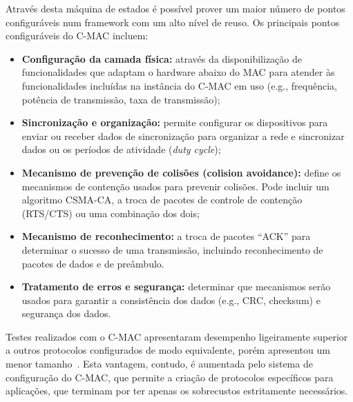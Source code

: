 Através desta máquina de estados é possível prover um maior número de pontos
configuráveis num framework com um alto nível de reuso. Os principais pontos
configuráveis do C-MAC incluem:
\begin{itemize}
  \item \textbf{Configuração da camada física:} através da disponibilização de
  funcionalidades que adaptam o hardware abaixo do MAC para atender às
  funcionalidades incluídas na instância do C-MAC em uso (e.g., frequência,
  potência de transmissão, taxa de transmissão);
  \item \textbf{Sincronização e organização:} permite configurar os dispositivos
  para enviar ou receber dados de sincronização para organizar a rede e
  sincronizar dados ou os períodos de atividade (\textit{duty cycle});
  \item \textbf{Mecanismo de prevenção de colisões (colision avoidance):} define
  os mecanismos de contenção usados para prevenir colisões. Pode incluir um
  algoritmo CSMA-CA, a troca de pacotes de controle de contenção (RTS/CTS) ou
  uma combinação dos dois;
  \item \textbf{Mecanismo de reconhecimento:} a troca de pacotes ``ACK'' para
  determinar o sucesso de uma transmissão, incluindo reconhecimento de pacotes
  de dados e de preâmbulo.
  \item \textbf{Tratamento de erros e segurança:} determinar que mecanismos
  serão usados para garantir a consistência dos dados (e.g., CRC, checksum) e
  segurança dos dados.
\end{itemize}

Testes realizados com o C-MAC apresentaram desempenho ligeiramente superior a
outros protocolos configurados de modo equivalente, porém apresentou um menor
tamanho~\cite{Wanner:IESS:2007}. Esta vantagem, contudo, é aumentada pelo
sistema de configuração do C-MAC, que permite a criação de protocolos
específicos para aplicações, que terminam por ter apenas os sobrecustos
estritamente necessários.
